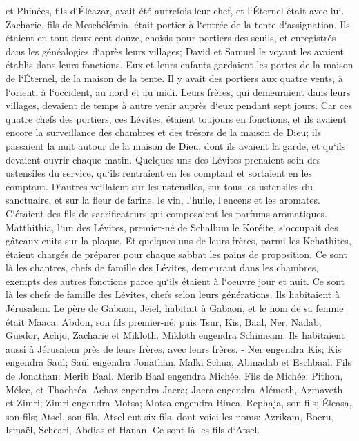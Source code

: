 \verse et Phinées, fils d`Éléazar, avait été autrefois leur chef, et l`Éternel était avec lui. 
\verse Zacharie, fils de Meschélémia, était portier à l`entrée de la tente d`assignation. 
\verse Ils étaient en tout deux cent douze, choisis pour portiers des seuils, et enregistrés dans les généalogies d`après leurs villages; David et Samuel le voyant les avaient établis dans leurs fonctions. 
\verse Eux et leurs enfants gardaient les portes de la maison de l`Éternel, de la maison de la tente. 
\verse Il y avait des portiers aux quatre vents, à l`orient, à l`occident, au nord et au midi. 
\verse Leurs frères, qui demeuraient dans leurs villages, devaient de temps à autre venir auprès d`eux pendant sept jours. 
\verse Car ces quatre chefs des portiers, ces Lévites, étaient toujours en fonctions, et ils avaient encore la surveillance des chambres et des trésors de la maison de Dieu; 
\verse ils passaient la nuit autour de la maison de Dieu, dont ils avaient la garde, et qu`ils devaient ouvrir chaque matin. 
\verse Quelques-uns des Lévites prenaient soin des ustensiles du service, qu`ils rentraient en les comptant et sortaient en les comptant. 
\verse D`autres veillaient sur les ustensiles, sur tous les ustensiles du sanctuaire, et sur la fleur de farine, le vin, l`huile, l`encens et les aromates. 
\verse C`étaient des fils de sacrificateurs qui composaient les parfums aromatiques. 
\verse Matthithia, l`un des Lévites, premier-né de Schallum le Koréite, s`occupait des gâteaux cuits sur la plaque. 
\verse Et quelques-uns de leurs frères, parmi les Kehathites, étaient chargés de préparer pour chaque sabbat les pains de proposition. 
\verse Ce sont là les chantres, chefs de famille des Lévites, demeurant dans les chambres, exempts des autres fonctions parce qu`ils étaient à l`oeuvre jour et nuit. 
\verse Ce sont là les chefs de famille des Lévites, chefs selon leurs générations. Ils habitaient à Jérusalem. 
\verse Le père de Gabaon, Jeïel, habitait à Gabaon, et le nom de sa femme était Maaca. 
\verse Abdon, son fils premier-né, puis Tsur, Kis, Baal, Ner, Nadab, 
\verse Guedor, Achjo, Zacharie et Mikloth. 
\verse Mikloth engendra Schimeam. Ils habitaient aussi à Jérusalem près de leurs frères, avec leurs frères. - 
\verse Ner engendra Kis; Kis engendra Saül; Saül engendra Jonathan, Malki Schua, Abinadab et Eschbaal. 
\verse Fils de Jonathan: Merib Baal. Merib Baal engendra Michée. 
\verse Fils de Michée: Pithon, Mélec, et Thachréa. 
\verse Achaz engendra Jaera; Jaera engendra Alémeth, Azmaveth et Zimri; Zimri engendra Motsa; Motsa engendra Binea. 
\verse Rephaja, son fils; Éleasa, son fils; Atsel, son fils. 
\verse Atsel eut six fils, dont voici les noms: Azrikam, Bocru, Ismaël, Scheari, Abdias et Hanan. Ce sont là les fils d`Atsel. 

